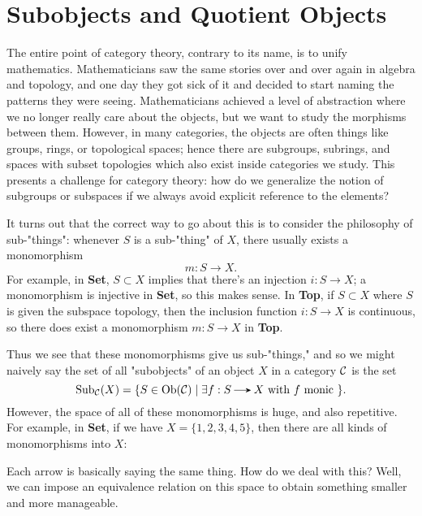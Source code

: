 \newpage
\section{Subobjects and Quotient Objects}
The entire point of category theory, contrary to its name, is to unify 
mathematics. Mathematicians saw the same stories over and over again in algebra 
and topology, and one day they got sick of it and decided to start naming the patterns 
they were seeing.
Mathematicians achieved a level of abstraction where we no longer really care about the objects, 
but we want to study the morphisms between them. 
However, in many categories, the objects are often things like groups, 
rings, or topological spaces; hence there are subgroups, subrings, 
and spaces with subset topologies which also exist inside categories we study. 
This presents a challenge for category theory: how do we generalize the notion of 
subgroups or subspaces if we always avoid explicit reference to the elements?

It turns out that the correct way to go about this is to consider the philosophy of 
sub-"things": whenever $S$ is a sub-"thing" of $X$, there usually exists a monomorphism
\[
    m: S \to X.
\] 
For example, in \textbf{Set}, $S \subset X$ implies that there's an injection $i: S \to X$; a monomorphism 
is injective in \textbf{Set}, so this makes sense. In \textbf{Top}, if $S \subset X$ where $S$ is given the subspace 
topology, then the inclusion function $i: S \to X$ is continuous, so there does exist 
a monomorphism $m: S \to X$ in \textbf{Top}. 

Thus we see that these monomorphisms give us sub-"things," and so we might naively say 
the set of all "subobjects" of an object $X$ in a category $\mathcal{C}$ is the set
\[
    \text{Sub}_{\cc}(X) = \{S \in \text{Ob}(\cc) \mid \exists f: S \to X \text{ with } f \text{ monic }\}.
\]
However, the space of all of 
these monomorphisms is huge, and also repetitive. For example, in \textbf{Set}, if we have 
$X = \{1, 2, 3, 4, 5\}$, then there are all kinds of monomorphisms into $X$:
\begin{center}
\end{center}
Each arrow is basically saying the same thing. How do we deal with this?
Well, we can impose an equivalence relation on this space to obtain something smaller
and more manageable.

